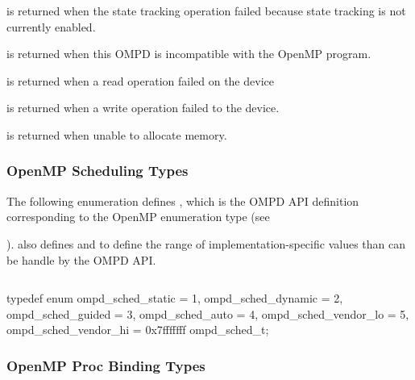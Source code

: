 \label{ompd:ompd_rc_needs_state_tracking}
 is returned when
the state tracking operation failed because state tracking is not currently enabled.

\label{ompd:ompd_rc_incompatible}
 is returned when
this OMPD is incompatible with the OpenMP program.

\label{ompd:ompd_rc_device_read_error}
 is returned when
a read operation failed on the device

\label{ompd:ompd_rc_device_write_error}
 is returned when
a write operation failed to the device.

\label{ompd:ompd_rc_nomem}
 is returned when
unable to allocate memory.

\subsubsection{OpenMP Scheduling Types}
\label{ompd:ompd_sched_t}

The following enumeration defines , which is the OMPD API definition 
corresponding to the OpenMP enumeration type  (see 

).
 also defines  and
 to define the range of implementation-specific 
 values than can be handle by the OMPD API.

\begin{quote}
	\begin{lstlisting}

	\end{lstlisting}
\end{quote}

\format

\begin{ccppspecific}
\begin{ompSyntax}
typedef enum {
  ompd_sched_static = 1,
  ompd_sched_dynamic = 2,
  ompd_sched_guided = 3,
  ompd_sched_auto = 4,
  ompd_sched_vendor_lo = 5,
  ompd_sched_vendor_hi = 0x7fffffff
} ompd_sched_t;
\end{ompSyntax}
\end{ccppspecific}


\subsubsection{OpenMP Proc Binding Types}
\label{ompd:ompd_proc_bind_t}

